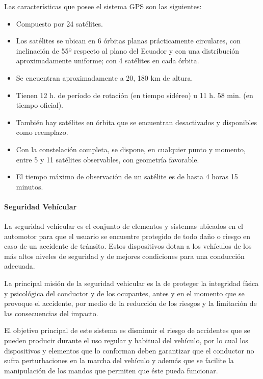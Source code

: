 Las características que posee el sistema GPS son las siguientes:
\begin{itemize}
\item Compuesto por 24 satélites.
\item Los satélites se ubican en 6 órbitas planas prácticamente circulares, con inclinación de 55º respecto al plano del Ecuador y con una distribución aproximadamente uniforme; con 4 satélites en cada órbita.
\item Se encuentran aproximadamente a 20, 180 km de altura.
\item Tienen 12 h. de período de rotación (en tiempo sidéreo) u 11 h. 58 min. (en tiempo oficial).
\item También hay satélites en órbita que se encuentran desactivados y disponibles como reemplazo.
\item Con la constelación completa, se dispone, en cualquier punto y momento, entre 5 y 11 satélites observables, con geometría favorable.
\item El tiempo máximo de observación de un satélite es de hasta 4 horas 15 minutos.
\end{itemize}

\paragraph{Seguridad Vehícular}

La seguridad vehicular es el conjunto de elementos y sistemas ubicados en el automotor para que el usuario se encuentre protegido de todo daño o riesgo en caso de un accidente de tránsito. Estos dispositivos dotan a los vehículos de los más altos niveles de seguridad y de mejores condiciones para una conducción adecuada.

La principal misión de la seguridad vehicular es la de proteger la integridad física y psicológica del conductor y de los ocupantes, antes y en el momento que se provoque el accidente, por medio de la reducción de los riesgos y la limitación de las consecuencias del impacto.

El objetivo principal de este sistema es disminuir el riesgo de accidentes que se pueden producir durante el uso regular y habitual del vehículo, por lo cual los dispositivos y elementos que lo conforman deben garantizar que el conductor no sufra perturbaciones en la marcha del vehículo y además que se facilite la manipulación de los mandos que permiten que éste pueda funcionar.

